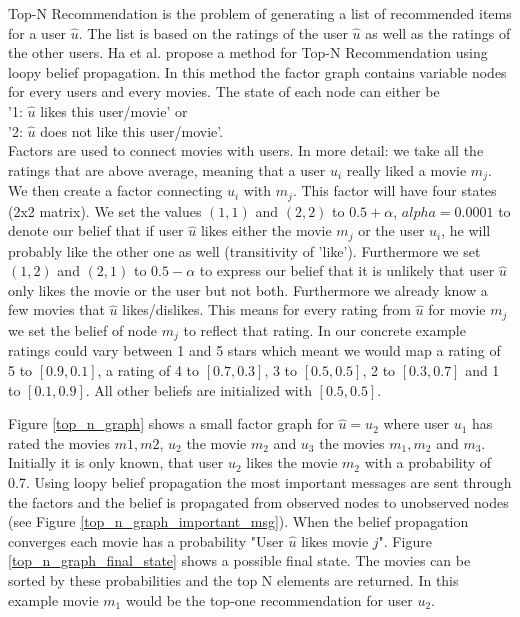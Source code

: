 Top-N Recommendation is the problem of generating a list of recommended items for a user $\hat u$. The list is based on the ratings of the user $\hat u$ as well as the ratings of the other users. Ha et al. \cite{Ha:2012:TRT:2396761.2398636} propose a method for Top-N Recommendation using loopy belief propagation. In this method the factor graph contains variable nodes for every users and every movies. The state of each node can either be\\
'1: $\hat u$ likes this user/movie' or\\
'2: $\hat u$ does not like this user/movie'. \\
Factors are used to connect movies with users. In more detail: we take all the ratings that are above average, meaning that a user $u_i$ really liked a movie $m_j$. We then create a factor connecting $u_i$ with $m_j$. This factor will have four states (2x2 matrix). We set the values $(1,1)$ and $(2,2)$ to $0.5 + \alpha$, $alpha = 0.0001$ to denote our belief that if user $\hat u$ likes either the movie $m_j$ or the user $u_i$, he will probably like the other one as well (transitivity of 'like'). Furthermore we set $(1,2)$ and $(2,1)$ to $0.5 - \alpha$ to express our belief that it is unlikely that user $\hat u$ only likes the movie or the user but not both.
Furthermore we already know a few movies that $\hat u$ likes/dislikes. This means for every rating from $\hat u$ for movie $m_j$ we set the belief of node $m_j$ to reflect that rating. In our concrete example ratings could vary between 1 and 5 stars which meant we would map a rating of 5 to $[0.9,0.1]$, a rating of 4 to $[0.7,0.3]$, 3 to $[0.5,0.5]$, 2 to $[0.3,0.7]$ and 1 to $[0.1,0.9]$. All other beliefs are initialized with $[0.5,0.5]$.

Figure \ref{top_n_graph} shows a small factor graph for  $\hat u = u_2$ where user $u_1$ has rated the movies $m1,m2$, $u_2$ the movie $m_2$ and $u_3$ the movies $m_1,m_2$ and $m_3$. Initially it is only known, that user $u_2$ likes the movie $m_2$ with a probability of 0.7. 
Using loopy belief propagation the most important messages are sent through the factors and the belief is propagated from observed nodes to unobserved nodes (see Figure \ref{top_n_graph_important_msg}). When the belief propagation converges each movie has a probability "User $\hat u$ likes movie $j$". Figure \ref{top_n_graph_final_state} shows a possible final state. The movies can be sorted by these probabilities and the top N elements are returned. In this example movie $m_1$ would be the top-one recommendation for user $u_2$.

